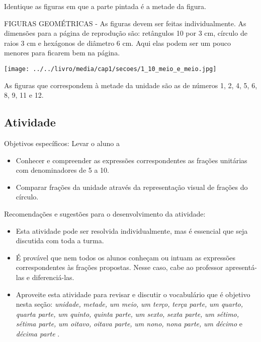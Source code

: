 \documentclass[a4paper,12pt,twoside]{book}
\begin{document}
Identique as figuras em que a parte pintada é a metade da figura.
\begin{imagem*}[breakable]{}{}    FIGURAS GEOMÉTRICAS - As figuras devem ser feitas individualmente. As dimensões para a página de reprodução são: retângulos 10 por 3 cm, círculo de raios 3 cm e hexágonos de diâmetro 6 cm. Aqui elas podem ser um pouco menores para ficarem bem na página.  
  
    \texttt{[image: ../../livro/media/cap1/secoes/1\_10\_meio\_e\_meio.jpg]}  
  
\end{imagem*}


\begin{resposta*}[breakable]{}{}  
  As figuras que correspondem à metade da unidade são as de números 1, 2, 4, 5, 6, 8, 9, 11 e 12.  
\end{resposta*}








\subsection{Atividade}




\begin{professor*}[breakable]{}{}     
  Objetivos específicos: Levar o aluno a   
\begin{itemize} %
    \item       Conhecer e compreender as expressões correspondentes as frações unitárias com denominadores de 5 a 10.
    \item       Comparar frações da unidade através da representação visual de frações do círculo.
\end{itemize} %
  
      
  Recomendações e sugestões para o desenvolvimento da atividade:  
\begin{itemize} %
    \item       Esta atividade pode ser resolvida individualmente, mas é essencial que seja discutida com toda a turma.  
    \item       É provável que nem todos os alunos conheçam ou intuam as expressões correspondentes às frações propostas. Nesse caso, cabe ao professor apresentá-las e diferenciá-las.
    \item       Aproveite esta atividade para revisar e discutir o vocabulário que é objetivo nesta seção:       {\it unidade,}             {\it metade,}             {\it um meio,}             {\it um terço,}             {\it terça parte,}             {\it um quarto,}             {\it quarta parte,}             {\it um quinto,}             {\it quinta parte,}             {\it um sexto,}             {\it sexta parte,}             {\it um sétimo,}             {\it sétima parte,}             {\it um oitavo,}             {\it oitava parte,}             {\it um nono,}             {\it nona parte,}             {\it um décimo}       e       {\it décima parte}      .
\end{itemize} %
  
  
\end{professor*}
\end{document}
